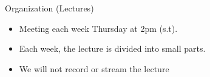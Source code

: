 \documentclass[aspectratio=169]{../latex_main/tntbeamer}  %
\begin{document}
\begin{frame}[c]{Organization (Lectures)}
	
	\begin{itemize}
		\item Meeting each week Thursday at 2pm (s.t).
		\pause
		\item Each week, the lecture is divided into small parts.
		\pause
		\item We will not record or stream the lecture
	\end{itemize}
	
\end{frame}
\end{document}
